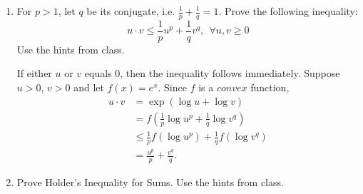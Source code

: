 \documentclass[12pt]{article}
\newcommand{\ds}{\displaystyle}
\begin{document}
\begin{enumerate}
\item For $p >1$, let $q$ be its conjugate, i.e. $\ds \frac{1}{p} + \frac{1}{q} = 1$. Prove the following inequality:
  $$\ds u \cdot v \leq \frac{1}{p} u^p + \frac{1}{q} v^q, \ \ \forall u, v \geq 0$$
  Use the hints from class. 
\begin{mybox}

  If either $u$ or $v$ equals $0$, then the inequality
    follows immediately. Suppose $u>0$, $v>0$ and let
    $f(x) = e^x$. Since $f$ is a $convex$ function,
    \begin{align*}
        u\cdot v &= \exp\left({\log{u}+\log{v}}\right)\\
        &= f\left(\frac{1}{p}\log{u^p} +\frac{1}{q}
        \log{v^q}\right)\\
        &\leq \frac{1}{p}f(\log{u^p})+\frac{1}{q}f(\log{v^q})\\
        &= \frac{u^p}{p}+\frac{v^q}{q}.
    \end{align*}
\end{mybox}

    
  \item Prove Holder's Inequality for Sums. Use the hints from class. 
  
  \begin{mybox}
    

\end{mybox}
\end{enumerate}
\end{document}
